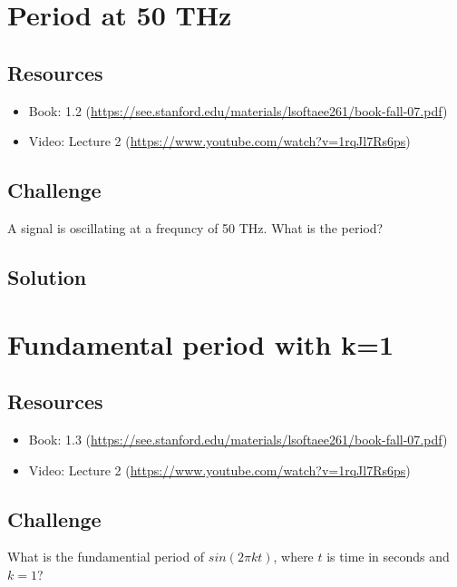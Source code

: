 \section{Period at 50 THz}

\subsection*{Resources}
\begin{itemize}
    \item Book: 1.2 (\url{https://see.stanford.edu/materials/lsoftaee261/book-fall-07.pdf})
    \item Video: Lecture 2 (\url{https://www.youtube.com/watch?v=1rqJl7Rs6ps})
\end{itemize}

\subsection*{Challenge}
A signal is oscillating at a frequncy of 50 THz.  What is the period?

\subsection*{Solution}





\newpage

\section {Fundamental period with k=1}

\subsection*{Resources}
\begin{itemize}
    \item Book: 1.3 (\url{https://see.stanford.edu/materials/lsoftaee261/book-fall-07.pdf})
    \item Video: Lecture 2 (\url{https://www.youtube.com/watch?v=1rqJl7Rs6ps})
\end{itemize}

\subsection*{Challenge}
What is the fundamential period of $sin(2 \pi k t)$, where $t$ is time in seconds and $k=1$?

